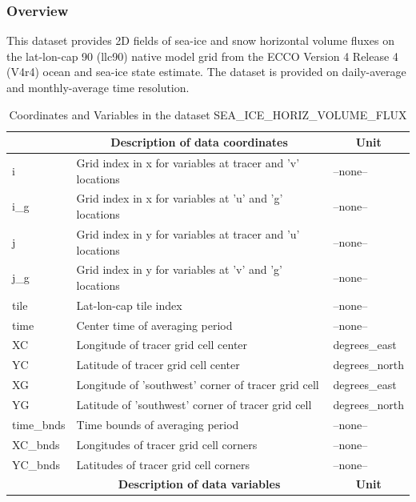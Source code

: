 \subsubsection{Overview}
This dataset provides 2D fields of sea-ice and snow horizontal volume fluxes on the lat-lon-cap 90 (llc90) native model grid from the ECCO Version 4 Release 4 (V4r4) ocean and sea-ice state estimate. The dataset is provided on daily-average and monthly-average time resolution. 
\begin{longtable}{|m{}|m{}|m{}|}
\caption{Coordinates and Variables in the dataset SEA\_ICE\_HORIZ\_VOLUME\_FLUX}
\label{tab:table-SEA_ICE_HORIZ_VOLUME_FLUX-fields} \\ 
\hline \endhead \hline \endfoot
\rowcolor{lightgray} \multicolumn{1}{|c|}{\textbf{Coordinates}} & \multicolumn{1}{|c|}{\textbf{Description of data coordinates}} &  \multicolumn{1}{|c|}{\textbf{Unit}}\\ \hline
i &Grid index in x for variables at tracer and 'v' locations &--none--  \\ \hline
i\_g &Grid index in x for variables at 'u' and 'g' locations &--none--  \\ \hline
j &Grid index in y for variables at tracer and 'u' locations &--none--  \\ \hline
j\_g &Grid index in y for variables at 'v' and 'g' locations &--none--  \\ \hline
tile &Lat-lon-cap tile index &--none--  \\ \hline
time &Center time of averaging period &--none--  \\ \hline
XC &Longitude of tracer grid cell center &degrees\_east  \\ \hline
YC &Latitude of tracer grid cell center &degrees\_north  \\ \hline
XG &Longitude of 'southwest' corner of tracer grid cell &degrees\_east  \\ \hline
YG &Latitude of 'southwest' corner of tracer grid cell &degrees\_north  \\ \hline
time\_bnds &Time bounds of averaging period &--none--  \\ \hline
XC\_bnds &Longitudes of tracer grid cell corners &--none--  \\ \hline
YC\_bnds &Latitudes of tracer grid cell corners &--none--  \\ \hline
\rowcolor{lightgray} \multicolumn{1}{|c|}{\textbf{Variables}} & \multicolumn{1}{|c|}{\textbf{Description of data variables}} &  \multicolumn{1}{|c|}{\textbf{Unit}}\\ \hline

\end{longtable}
